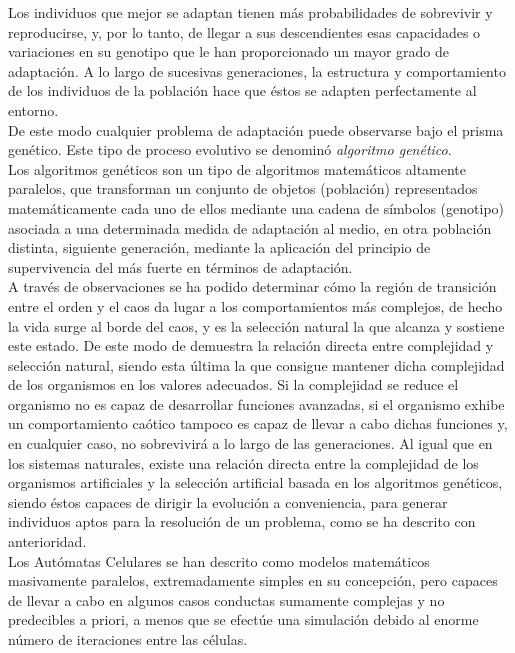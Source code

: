Los individuos que mejor se adaptan tienen más probabilidades de sobrevivir y reproducirse, y, por lo tanto, de llegar a sus descendientes esas capacidades o variaciones en su genotipo que le han proporcionado un mayor grado de adaptación. A lo largo de sucesivas generaciones, la estructura y comportamiento de los individuos de la población hace que éstos se adapten perfectamente al entorno.\\

De este modo cualquier problema de adaptación puede observarse bajo el prisma genético. Este tipo de proceso evolutivo se denominó \textit{algoritmo genético}.\\

Los algoritmos genéticos son un tipo de algoritmos matemáticos altamente paralelos, que transforman un conjunto de objetos (población) representados matemáticamente cada uno de ellos mediante una cadena de símbolos (genotipo) asociada a una determinada medida de adaptación al medio, en otra población distinta, siguiente generación, mediante la aplicación del principio de supervivencia del más fuerte en términos de adaptación.\\


A través de observaciones se ha podido determinar cómo la región de transición entre el orden y el caos da lugar a los comportamientos más complejos, de hecho la vida surge al borde del caos, y es la selección natural la que alcanza y sostiene este estado. De este modo de demuestra la relación directa entre complejidad y selección natural, siendo esta última la que consigue mantener dicha complejidad de los organismos en los valores adecuados. Si la complejidad se reduce el organismo no es capaz de desarrollar funciones avanzadas, si el organismo exhibe un comportamiento caótico tampoco es capaz de llevar a cabo dichas funciones y, en cualquier caso, no sobrevivirá a lo largo de las generaciones. Al igual que en los sistemas naturales, existe una relación directa entre la complejidad de los organismos artificiales y la selección artificial basada en los algoritmos genéticos, siendo éstos capaces de dirigir la evolución a conveniencia, para generar individuos aptos para la resolución de un problema, como se ha descrito con anterioridad.\\

Los Autómatas Celulares se han descrito como modelos matemáticos masivamente paralelos, extremadamente simples en su concepción, pero capaces de llevar a cabo en algunos casos conductas sumamente complejas y no predecibles a priori, a menos que se efectúe una simulación debido al enorme número de iteraciones entre las células.\\


